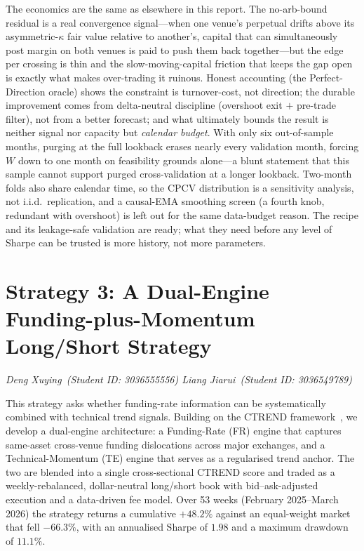 \documentclass[10pt,twocolumn,a4paper]{article}
\begin{document}
The economics are the same as elsewhere in this report. The no-arb-bound residual is a real convergence signal---when one venue's perpetual drifts above its asymmetric-$\kappa$ fair value relative to another's, capital that can simultaneously post margin on both venues is paid to push them back together---but the edge per crossing is thin and the slow-moving-capital friction that keeps the gap open is exactly what makes over-trading it ruinous. Honest accounting (the Perfect-Direction oracle) shows the constraint is turnover-cost, not direction; the durable improvement comes from delta-neutral discipline (overshoot exit $+$ pre-trade filter), not from a better forecast; and what ultimately bounds the result is neither signal nor capacity but \emph{calendar budget}. With only six out-of-sample months, purging at the full lookback erases nearly every validation month, forcing $W$ down to one month on feasibility grounds alone---a blunt statement that this sample cannot support purged cross-validation at a longer lookback. Two-month folds also share calendar time, so the CPCV distribution is a sensitivity analysis, not i.i.d.\ replication, and a causal-EMA smoothing screen (a fourth knob, redundant with overshoot) is left out for the same data-budget reason. The recipe and its leakage-safe validation are ready; what they need before any level of Sharpe can be trusted is more history, not more parameters.


\clearpage
\section{Strategy 3: A Dual-Engine Funding-plus-Momentum Long/Short Strategy}
\label{sec:strat3}
\begingroup\par\vspace{-2pt}%
{\small\itshape Deng Xuying\ (Student ID: 3036555556)\quad
 Liang Jiarui\ (Student ID: 3036549789)}\par\vspace{4pt}\endgroup

This strategy asks whether funding-rate information can be systematically
combined with technical trend signals.  Building on the CTREND
framework~\cite{fieberg2025trend}, we develop a dual-engine architecture: a
Funding-Rate (FR) engine that
captures same-asset cross-venue funding dislocations across major
exchanges, and a Technical-Momentum (TE) engine that serves as a
regularised trend anchor.  The two are blended into a single cross-sectional
CTREND score and traded as a weekly-rebalanced, dollar-neutral long/short
book with bid--ask-adjusted execution and a data-driven fee model.  Over 53
weeks (February 2025--March 2026) the strategy returns a cumulative
$+48.2\%$ against an equal-weight market that fell $-66.3\%$, with an
annualised Sharpe of $1.98$ and a maximum drawdown of $11.1\%$.
\end{document}

